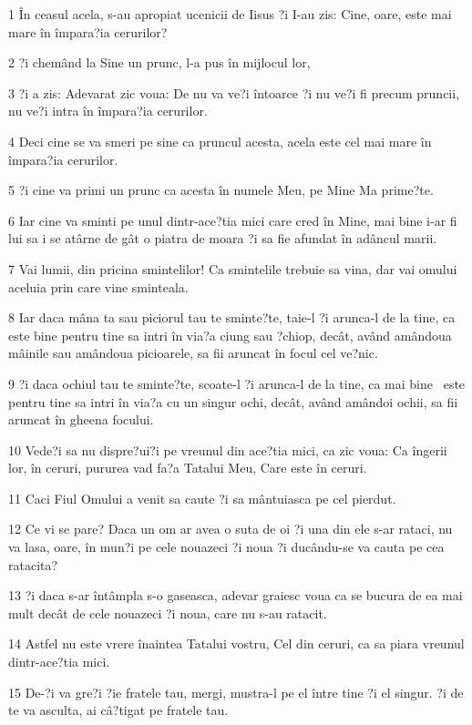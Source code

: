 \par 1 În ceasul acela, s-au apropiat ucenicii de Iisus ?i I-au zis: Cine, oare, este mai mare în împara?ia cerurilor?
\par 2 ?i chemând la Sine un prunc, l-a pus în mijlocul lor,
\par 3 ?i a zis: Adevarat zic voua: De nu va ve?i întoarce ?i nu ve?i fi precum pruncii, nu ve?i intra în împara?ia cerurilor.
\par 4 Deci cine se va smeri pe sine ca pruncul acesta, acela este cel mai mare în împara?ia cerurilor.
\par 5 ?i cine va primi un prunc ca acesta în numele Meu, pe Mine Ma prime?te.
\par 6 Iar cine va sminti pe unul dintr-ace?tia mici care cred în Mine, mai bine i-ar fi lui sa i se atârne de gât o piatra de moara ?i sa fie afundat în adâncul marii.
\par 7 Vai lumii, din pricina smintelilor! Ca smintelile trebuie sa vina, dar vai omului aceluia prin care vine sminteala.
\par 8 Iar daca mâna ta sau piciorul tau te sminte?te, taie-l ?i arunca-l de la tine, ca este bine pentru tine sa intri în via?a ciung sau ?chiop, decât, având amândoua mâinile sau amândoua picioarele, sa fii aruncat în focul cel ve?nic.
\par 9 ?i daca ochiul tau te sminte?te, scoate-l ?i arunca-l de la tine, ca mai bine  este pentru tine sa intri în via?a cu un singur ochi, decât, având amândoi ochii, sa fii aruncat în gheena focului.
\par 10 Vede?i sa nu dispre?ui?i pe vreunul din ace?tia mici, ca zic voua: Ca îngerii lor, în ceruri, pururea vad fa?a Tatalui Meu, Care este în ceruri.
\par 11 Caci Fiul Omului a venit sa caute ?i sa mântuiasca pe cel pierdut.
\par 12 Ce vi se pare? Daca un om ar avea o suta de oi ?i una din ele s-ar rataci, nu va lasa, oare, în mun?i pe cele nouazeci ?i noua ?i ducându-se va cauta pe cea ratacita?
\par 13 ?i daca s-ar întâmpla s-o gaseasca, adevar graiesc voua ca se bucura de ea mai mult decât de cele nouazeci ?i noua, care nu s-au ratacit.
\par 14 Astfel nu este vrere înaintea Tatalui vostru, Cel din ceruri, ca sa piara vreunul dintr-ace?tia mici.
\par 15 De-?i va gre?i ?ie fratele tau, mergi, mustra-l pe el între tine ?i el singur. ?i de te va asculta, ai câ?tigat pe fratele tau.
